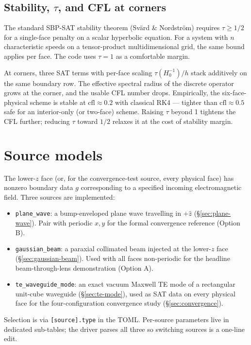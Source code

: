 \documentclass[11pt]{article}
\newcommand{\hz}{\hat{z}}
\begin{document}
\subsection{Stability, $\tau$, and CFL at corners}
\label{sec:stability-tau}

The standard SBP-SAT stability theorem (Svärd \& Nordström)
requires $\tau \geq 1/2$ for a single-face penalty on a scalar
hyperbolic equation.  For a system with $n$ characteristic speeds
on a tensor-product multidimensional grid, the same bound applies
per face.  The code uses $\tau = 1$ as a comfortable margin.

At corners, three SAT terms with per-face scaling
$\tau (H^{-1}_0)/h$ stack additively on the same boundary row.
The effective spectral radius of the discrete operator grows at
the corner, and the usable CFL number drops.  Empirically, the
six-face-physical scheme is stable at $\mathrm{cfl} \approx 0.2$
with classical RK4 --- tighter than $\mathrm{cfl} \approx 0.5$
safe for an interior-only (or two-face) scheme.  Raising $\tau$
beyond 1 tightens the CFL further; reducing $\tau$ toward $1/2$
relaxes it at the cost of stability margin.

\section{Source models}
\label{sec:sources}

The lower-$z$ face (or, for the convergence-test source, every
physical face) has nonzero boundary data $g$ corresponding to a
specified incoming electromagnetic field.  Three sources are
implemented:

\begin{itemize}[itemsep=2pt,topsep=2pt]
  \item \texttt{plane\_wave}: a bump-enveloped plane wave
        travelling in $+\hz$ (\S\ref{sec:plane-wave}).  Pair with
        periodic $x, y$ for the formal convergence reference
        (Option B).
  \item \texttt{gaussian\_beam}: a paraxial collimated beam
        injected at the lower-$z$ face (\S\ref{sec:gaussian-beam}).
        Used with all faces non-periodic for the headline
        beam-through-lens demonstration (Option A).
  \item \texttt{te\_waveguide\_mode}: an exact vacuum Maxwell TE
        mode of a rectangular unit-cube waveguide
        (\S\ref{sec:te-mode}), used as SAT data on every physical
        face for the four-configuration convergence study
        (\S\ref{sec:convergence}).
\end{itemize}
Selection is via \texttt{[source].type} in the TOML.  Per-source
parameters live in dedicated sub-tables; the driver parses all
three so switching sources is a one-line edit.
\end{document}
